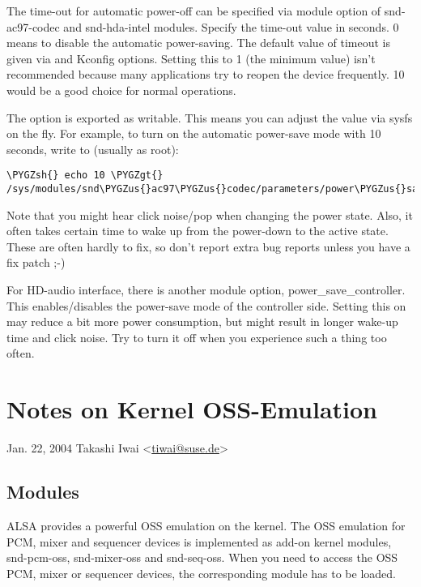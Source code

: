 \documentclass[a4paper,8pt,english]{sphinxmanual}
\def\PYGZus{\char`\_}
\def\PYGZgt{\char`\>}
\def\PYGZsh{\char`\#}
\begin{document}
The time-out for automatic power-off can be specified via 
module option of snd-ac97-codec and snd-hda-intel modules.  Specify
the time-out value in seconds.  0 means to disable the automatic
power-saving.  The default value of timeout is given via
 and
 Kconfig options.  Setting this to 1
(the minimum value) isn't recommended because many applications try to
reopen the device frequently.  10 would be a good choice for normal
operations.

The  option is exported as writable.  This means you can
adjust the value via sysfs on the fly.  For example, to turn on the
automatic power-save mode with 10 seconds, write to
 (usually as root):

\begin{Verbatim}[commandchars=\\\{\}]
\PYGZsh{} echo 10 \PYGZgt{} /sys/modules/snd\PYGZus{}ac97\PYGZus{}codec/parameters/power\PYGZus{}save
\end{Verbatim}

Note that you might hear click noise/pop when changing the power
state.  Also, it often takes certain time to wake up from the
power-down to the active state.  These are often hardly to fix, so
don't report extra bug reports unless you have a fix patch ;-)

For HD-audio interface, there is another module option,
power\_save\_controller.  This enables/disables the power-save mode of
the controller side.  Setting this on may reduce a bit more power
consumption, but might result in longer wake-up time and click noise.
Try to turn it off when you experience such a thing too often.


\section{Notes on Kernel OSS-Emulation}
\label{sound/designs/oss-emulation::doc}\label{sound/designs/oss-emulation:notes-on-kernel-oss-emulation}
Jan. 22, 2004  Takashi Iwai \textless{}\href{mailto:tiwai@suse.de}{tiwai@suse.de}\textgreater{}


\subsection{Modules}
\label{sound/designs/oss-emulation:modules}
ALSA provides a powerful OSS emulation on the kernel.
The OSS emulation for PCM, mixer and sequencer devices is implemented
as add-on kernel modules, snd-pcm-oss, snd-mixer-oss and snd-seq-oss.
When you need to access the OSS PCM, mixer or sequencer devices, the
corresponding module has to be loaded.
\end{document}
